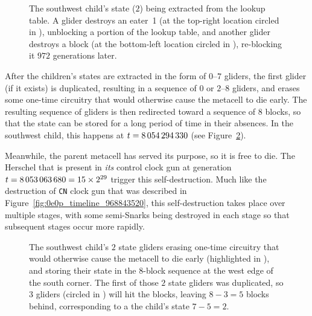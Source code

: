\begin{figure}[!htb]
\centering
{}
\caption{The southwest child's state ($2$) being extracted from the lookup table. A glider destroys an eater~1 (at the top-right location circled in ), unblocking a portion of the lookup table, and another glider destroys a block (at the bottom-left location circled in ), re-blocking it $972$ generations later.}
\label{fig:0e0p_timeline_8054286989}
\end{figure}

After the children's states are extracted in the form of $0$--$7$ gliders, the first glider (if it exists) is duplicated, resulting in a sequence of $0$ or $2$--$8$ gliders, and erases some one-time circuitry that would otherwise cause the metacell to die early. The resulting sequence of gliders is then redirected toward a sequence of $8$ blocks, so that the state can be stored for a long period of time in their absences. In the southwest child, this happens at $t = 8{\,}054{\,}294{\,}330$ (see Figure~\ref{fig:0e0p_timeline_8054294330}).

Meanwhile, the parent metacell has served its purpose, so it is free to die. The Herschel that is present in \emph{its} control clock gun at generation $t = 8{\,}053{\,}063{\,}680 = 15 \times 2^{29}$ trigger this self-destruction. Much like the destruction of \texttt{CN} clock gun that was described in Figure~\ref{fig:0e0p_timeline_968843520}, this self-destruction takes place over multiple stages, with some semi-Snarks being destroyed in each stage so that subsequent stages occur more rapidly.

\begin{figure}[!htb]
	\centering
	\caption{The southwest child's $2$ state gliders erasing one-time circuitry that would otherwise cause the metacell to die early (highlighted in ), and storing their state in the $8$-block sequence at the west edge of the south corner. The first of those $2$ state gliders was duplicated, so $3$ gliders (circled in ) will hit the blocks, leaving $8-3 = 5$ blocks behind, corresponding to a the child's state $7 - 5 = 2$.}
	\label{fig:0e0p_timeline_8054294330}
\end{figure}

